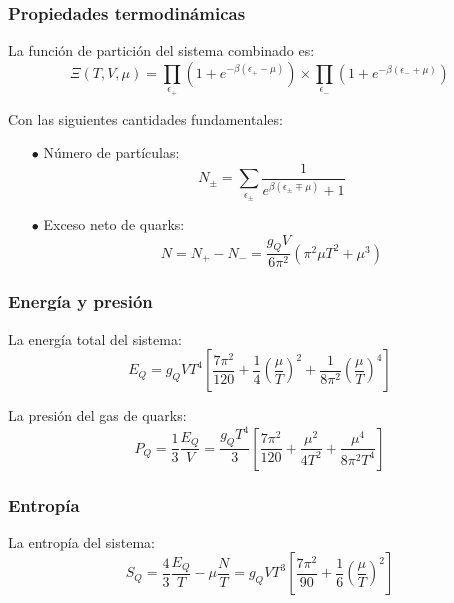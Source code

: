 \subsubsection{Propiedades termodinámicas}
La función de partición del sistema combinado es:
\begin{equation}
\Xi(T,V,\mu) = \prod_{\epsilon_+} \left(1 + e^{-\beta(\epsilon_+-\mu)}\right) \times \prod_{\epsilon_-} \left(1 + e^{-\beta(\epsilon_-+\mu)}\right)
\end{equation}

Con las siguientes cantidades fundamentales:
\begin{itemize}
\item[$\bullet$] Número de partículas:
\begin{equation}
N_\pm = \sum_{\epsilon_\pm} \frac{1}{e^{\beta(\epsilon_\pm\mp\mu)} + 1}
\end{equation}

\item[$\bullet$] Exceso neto de quarks:
\begin{equation}\label{eq-FD-Excedente}
N = N_+ - N_- = \frac{g_Q V}{6\pi^2} \left(\pi^2 \mu T^2 + \mu^3\right)
\end{equation}
\end{itemize}

\subsubsection{Energía y presión}
La energía total del sistema:
\begin{equation}\label{eq-FD-Energy}
E_Q = g_Q V T^4 \left[\frac{7\pi^2}{120} + \frac{1}{4}\left(\frac{\mu}{T}\right)^2 + \frac{1}{8\pi^2}\left(\frac{\mu}{T}\right)^4\right]
\end{equation}

La presión del gas de quarks:
\begin{equation}
P_Q = \frac{1}{3}\frac{E_Q}{V} = \frac{g_Q T^4}{3} \left[\frac{7\pi^2}{120} + \frac{\mu^2}{4T^2} + \frac{\mu^4}{8\pi^2T^4}\right]
\end{equation}

\subsubsection{Entropía}
La entropía del sistema:
\begin{equation}\label{eq-FD-Entropy}
S_Q = \frac{4}{3}\frac{E_Q}{T} - \mu\frac{N}{T} = g_Q V T^3 \left[\frac{7\pi^2}{90} + \frac{1}{6}\left(\frac{\mu}{T}\right)^2\right]
\end{equation}

